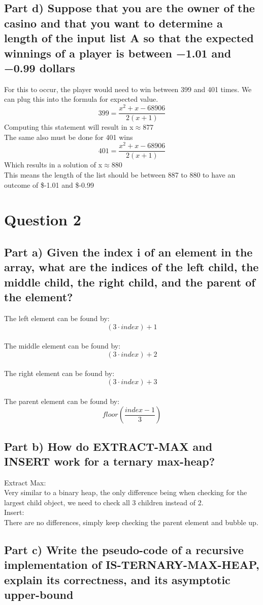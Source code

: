 \documentclass[11pt]{article}
\begin{document}
\subsection{Part d) Suppose that you are the owner of the casino and that you want to determine a length of the input list A so that the expected winnings of a player is between −1.01 and −0.99 dollars}
\label{sec-1-4}
For this to occur, the player would need to win between 399 and 401 times. We can plug this into the formula for expected value.
\[399 = \frac{x^2+x-68906}{2(x+1)}\]
Computing this statement will result in x$\approx$877\\
   The same also must be done for 401 wins
\[401 = \frac{x^2+x-68906}{2(x+1)}\]
Which results in a solution of x$\approx$880\\
   This means the length of the list should be between 887 to 880 to have an outcome of \$-1.01 and \$-0.99
\section{Question 2}
\label{sec-2}
\subsection{Part a) Given the index i of an element in the array, what are the indices of the left child, the middle child, the right child, and the parent of the element?}
\label{sec-2-1}
The left element can be found by: $$(3\cdot{}index) + 1$$\\
   The middle element can be found by: $$(3\cdot{}index) + 2$$\\
   The right element can be found by: $$(3\cdot{}index) + 3$$\\
   The parent element can be found by: $$floor(\frac{index-1}{3})$$
\subsection{Part b) How do EXTRACT-MAX and INSERT work for a ternary max-heap?}
\label{sec-2-2}
Extract Max:\\
   Very similar to a binary heap, the only difference being when checking for the largest child object, we need to check all 3 children instead of 2.\\

Insert:\\
   There are no differences, simply keep checking the parent element and bubble up.\\
\subsection{Part c) Write the pseudo-code of a recursive implementation of IS-TERNARY-MAX-HEAP, explain its correctness, and its asymptotic upper-bound}
\label{sec-2-3}
\end{document}
